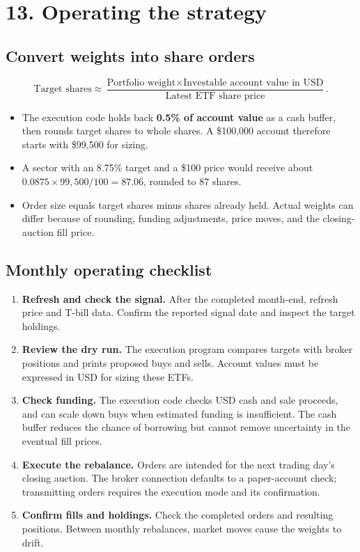 \documentclass[11pt,letterpaper]{article}
\newcommand{\topic}[1]{\Needspace{5\baselineskip}\subsection*{#1}}
\newcommand{\word}[1]{\text{#1}}
\newcommand{\guidepage}[1]{\clearpage\section*{#1}}
\begin{document}
\guidepage{13. Operating the strategy}
\topic{Convert weights into share orders}
\[
\word{Target shares}\approx
\frac{\word{Portfolio weight}\times\word{Investable account value in USD}}
{\word{Latest ETF share price}}.
\]
\begin{itemize}
\item The execution code holds back \textbf{0.5\% of account value} as a cash buffer, then rounds target shares to whole shares. A \$100,000 account therefore starts with \$99,500 for sizing.
\item A sector with an 8.75\% target and a \$100 price would receive about $0.0875\times99{,}500/100=87.06$, rounded to 87 shares.
\item Order size equals target shares minus shares already held. Actual weights can differ because of rounding, funding adjustments, price moves, and the closing-auction fill price.
\end{itemize}

\topic{Monthly operating checklist}
\begin{enumerate}
\item \textbf{Refresh and check the signal.} After the completed month-end, refresh price and T-bill data. Confirm the reported signal date and inspect the target holdings.
\item \textbf{Review the dry run.} The execution program compares targets with broker positions and prints proposed buys and sells. Account values must be expressed in USD for sizing these ETFs.
\item \textbf{Check funding.} The execution code checks USD cash and sale proceeds, and can scale down buys when estimated funding is insufficient. The cash buffer reduces the chance of borrowing but cannot remove uncertainty in the eventual fill prices.
\item \textbf{Execute the rebalance.} Orders are intended for the next trading day's closing auction. The broker connection defaults to a paper-account check; transmitting orders requires the execution mode and its confirmation.
\item \textbf{Confirm fills and holdings.} Check the completed orders and resulting positions. Between monthly rebalances, market moves cause the weights to drift.
\end{enumerate}
\end{document}
